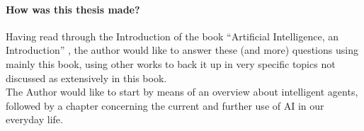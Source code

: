 \paragraph{How was this thesis made?}
Having read through the Introduction of the book “Artificial Intelligence, an Introduction” \cite{russellArtificialIntelligenceModern2010}, the author would like to answer these (and more) questions using mainly this book, using other works to back it up in very specific topics not discussed as extensively in this book.\\The Author would like to start by means of an overview about intelligent agents, followed by a chapter concerning the current and further use of AI in our everyday life.\\